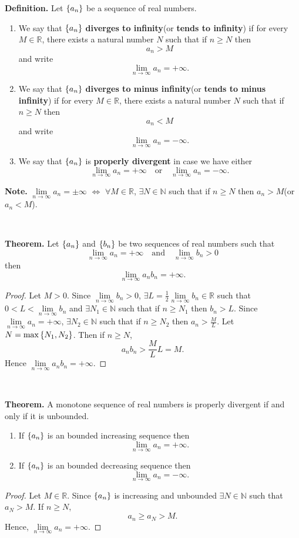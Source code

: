 \documentclass[12pt,a4paper]{article}
\begin{document}
\newpage
\begin{tcolorbox}[colback=white]
	\textbf{Definition.} Let $\set{a_n}$ be a sequence of real numbers. \begin{enumerate}
		\item We say that $\set{a_n}$ \textbf{diverges to infinity}(or \textbf{tends to infinity}) if for every $M\in\mathbb{R}$, there exists a natural number $N$ such that if $n\geq N$ then \[
		a_n>M
		\] and write \[
		\lim\limits_{n\to\infty}a_n=+\infty.
		\]
		\item We say that $\set{a_n}$ \textbf{diverges to minus infinity}(or \textbf{tends to minus infinity}) if for every $M\in\mathbb{R}$, there exists a natural number $N$ such that if $n\geq N$ then \[
		a_n<M
		\] and write \[
		\lim\limits_{n\to\infty}a_n=-\infty.
		\]
		\item We say that $\set{a_n}$ is \textbf{properly divergent} in case we have either \[
		\lim\limits_{n\to\infty}a_n=+\infty\quad\text{or}\quad\lim\limits_{n\to\infty}a_n=-\infty.
		\]
	\end{enumerate}\tcblower
	\textbf{Note.} $\lim\limits_{n\to\infty}a_n=\pm\infty$ $\iff$ $\forall M\in\mathbb{R}$, $\exists N\in\mathbb{N}$ such that if $n\geq N$ then $a_n>M$(or $a_n<M$).
\end{tcolorbox}
\
\begin{tcolorbox}[colback=white]
	\textbf{Theorem.} Let $\set{a_n}$ and $\set{b_n}$ be two sequences of real numbers such that \[
	\lim\limits_{n\to\infty}a_n=+\infty\quad\text{and}\quad\lim\limits_{n\to\infty}b_n>0
	\] then \[
	\lim\limits_{n\to\infty}a_nb_n=+\infty.
	\]\tcblower\begin{proof}
		Let $M>0$. Since $\lim\limits_{n\to\infty}b_n>0$, $\exists L=\frac{1}{2}\lim\limits_{n\to\infty}b_n\in\mathbb{R}$ such that $0<L<\lim\limits_{n\to\infty}b_n$ and $\exists N_1\in\mathbb{N}$ such that if $n\geq N_1$ then $b_n>L$. Since $\lim\limits_{n\to\infty}a_n=+\infty$, $\exists N_2\in\mathbb{N}$ such that if $n\geq N_2$ then $a_n>\frac{M}{L}$. Let $N=\max\set{N_1,N_2}$. Then if $n\geq N$, \[
		a_nb_n>\frac{M}{L}L=M.
		\] Hence $\lim\limits_{n\to\infty}a_nb_n=+\infty$.
	\end{proof}
\end{tcolorbox}
\
\begin{tcolorbox}[colback=white]
	\textbf{Theorem.} A monotone sequence of real numbers is properly divergent if and only if it is unbounded.
	\begin{enumerate}
		\item If $\set{a_n}$ is an bounded increasing sequence then \[
		\lim\limits_{n\to\infty}a_n=+\infty.
		\]
		\item If $\set{a_n}$ is an bounded decreasing sequence then \[
		\lim\limits_{n\to\infty}a_n=-\infty.
		\]
	\end{enumerate}\tcblower\begin{proof}
	Let $M\in\mathbb{R}$. Since $\set{a_n}$ is increasing and unbounded $\exists N\in\mathbb{N}$ such that $a_N>M$. If $n\geq N$, \[
	a_n\geq a_N>M.
	\] Hence, $\lim\limits_{n\to\infty}a_n=+\infty$.
\end{proof}
\end{tcolorbox}
\end{document}

